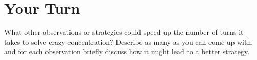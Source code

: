 \documentclass[10pt]{article}
\newif\ifpaper
\begin{document}
\ifpaper
\begin{tcolorbox}
The player realizes $c_i = c_j$ in at most $c_i$ steps.
Again, suppose our cards follow the trajectory $\{x_0,y_0\}=\{i,j\}$, $\{x_1,y_1\}$, $\dots$, $\{x_{c_i},y_{c_i}\}=\{i,j\}$. On the first turn, flip over cards $\{i,j\}$, and first assume they do not match. Then on turn $t$ for $2\le t\le c_i$, flip over cards $\{x_{t-1},y_{t-1}\}$. We know that they will not match and thus tracking their trajectories, we will be able to determine what the entire cycle is. If they do match, then we essentially restart the strategy. That is, flip over $\{i,j\}$ again: if they don't match, then for $3\le t\le c_i$, flip over cards $\{x_{t-2},y_{t-2}\}$. If they do match, then repeat again.
\end{tcolorbox}
\fi


\section{Your Turn}
\begin{problem}[5 points]
What other observations or strategies could speed up the number of turns
it takes to solve crazy concentration?
Describe as many as you can come up with,
and for each observation briefly discuss how it might lead to a better strategy.
\end{problem}
\end{document}
